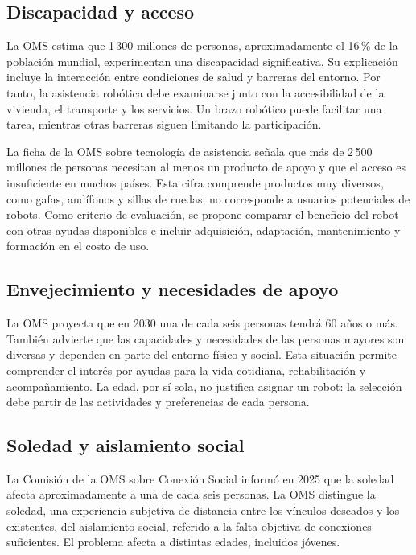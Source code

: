 \documentclass[11pt,a4paper]{article}
\begin{document}
\subsection{Discapacidad y acceso}
La OMS estima que 1\,300 millones de personas, aproximadamente el 16\,\% de la población mundial, experimentan una discapacidad significativa. Su explicación incluye la interacción entre condiciones de salud y barreras del entorno. Por tanto, la asistencia robótica debe examinarse junto con la accesibilidad de la vivienda, el transporte y los servicios. Un brazo robótico puede facilitar una tarea, mientras otras barreras siguen limitando la participación.\cite{omsdiscapacidad}

La ficha de la OMS sobre tecnología de asistencia señala que más de 2\,500 millones de personas necesitan al menos un producto de apoyo y que el acceso es insuficiente en muchos países. Esta cifra comprende productos muy diversos, como gafas, audífonos y sillas de ruedas; no corresponde a usuarios potenciales de robots.\cite{omstech} Como criterio de evaluación, se propone comparar el beneficio del robot con otras ayudas disponibles e incluir adquisición, adaptación, mantenimiento y formación en el costo de uso.

\subsection{Envejecimiento y necesidades de apoyo}
La OMS proyecta que en 2030 una de cada seis personas tendrá 60 años o más. También advierte que las capacidades y necesidades de las personas mayores son diversas y dependen en parte del entorno físico y social.\cite{omsenvejecimiento} Esta situación permite comprender el interés por ayudas para la vida cotidiana, rehabilitación y acompañamiento. La edad, por sí sola, no justifica asignar un robot: la selección debe partir de las actividades y preferencias de cada persona.

\subsection{Soledad y aislamiento social}
La Comisión de la OMS sobre Conexión Social informó en 2025 que la soledad afecta aproximadamente a una de cada seis personas. La OMS distingue la soledad, una experiencia subjetiva de distancia entre los vínculos deseados y los existentes, del aislamiento social, referido a la falta objetiva de conexiones suficientes. El problema afecta a distintas edades, incluidos jóvenes.\cite{omssoledad}
\end{document}
